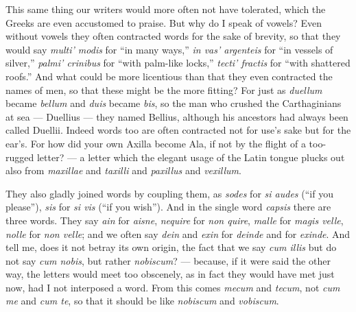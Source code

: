  This same thing our writers would more often not have tolerated, which the Greeks are even accustomed to praise. But why do I speak of vowels? Even without vowels they often contracted words for the sake of brevity, so that they would say \textit{multi' modis} for ``in many ways,'' \textit{in vas' argenteis} for ``in vessels of silver,'' \textit{palmi' crinibus} for ``with palm-like locks,'' \textit{tecti' fractis} for ``with shattered roofs.'' And what could be more licentious than that they even contracted the names of men, so that these might be the more fitting? For just as \textit{duellum} became \textit{bellum} and \textit{duis} became \textit{bis}, so the man who crushed the Carthaginians at sea — Duellius — they named Bellius, although his ancestors had always been called Duellii. Indeed words too are often contracted not for use's sake but for the ear's. For how did your own Axilla become Ala, if not by the flight of a too-rugged letter? — a letter which the elegant usage of the Latin tongue plucks out also from \textit{maxillae} and \textit{taxilli} and \textit{paxillus} and \textit{vexillum}.

 They also gladly joined words by coupling them, as \textit{sodes} for \textit{si audes} (``if you please''), \textit{sis} for \textit{si vis} (``if you wish''). And in the single word \textit{capsis} there are three words. They say \textit{ain} for \textit{aisne}, \textit{nequire} for \textit{non quire}, \textit{malle} for \textit{magis velle}, \textit{nolle} for \textit{non velle}; and we often say \textit{dein} and \textit{exin} for \textit{deinde} and for \textit{exinde}. And tell me, does it not betray its own origin, the fact that we say \textit{cum illis} but do not say \textit{cum nobis}, but rather \textit{nobiscum}? — because, if it were said the other way, the letters would meet too obscenely, as in fact they would have met just now, had I not interposed a word. From this comes \textit{mecum} and \textit{tecum}, not \textit{cum me} and \textit{cum te}, so that it should be like \textit{nobiscum} and \textit{vobiscum}.

